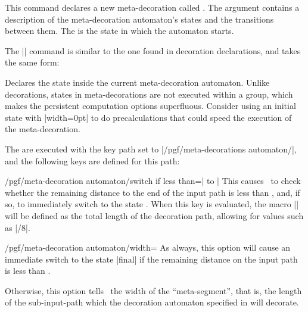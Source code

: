 \begin{command}{\pgfdeclaremetadecorate{}}
    This command declares a new meta-decoration called . The
     argument contains a description of the meta-decoration
    automaton's states and the transitions between them. The  is the state in which the automaton starts.

    The |\state| command is similar to the one found in decoration
    declarations, and takes the same form:

    \begin{command}{\state{}} Declares the
        state  inside the current meta-decoration automaton. Unlike
        decorations, states in meta-decorations are not executed within a
        group, which makes the persistent computation options superfluous.
        Consider using an initial state with |width=0pt| to do precalculations
        that could speed the execution of the meta-decoration.

        The  are executed with the key path set to
        |/pgf/meta-decorations automaton/|, and the following keys are defined
        for this path:

        \begin{key}{/pgf/meta-decoration automaton/switch if less than=| to |}
            This causes \pgfname\ to check whether the remaining distance to
            the end of the input path is less than , and, if
            so, to immediately switch to the state . When this
            key is evaluated, the macro |\pgfmetadecoratedpathlength| will be
            defined as the total length of the decoration path, allowing for
            values such as |\pgfmetadecoratedpathlength/8|.
        \end{key}

        \begin{key}{/pgf/meta-decoration automaton/width=}
            As always, this option will cause an immediate switch to the state
            |final| if the remaining distance on the input path is less than
            .

            Otherwise, this option tells \pgfname\ the width of the
            ``meta-segment'', that is, the length of the sub-input-path which
            the decoration automaton specified  in  will decorate.
        \end{key}


\end{command}
\end{command}
